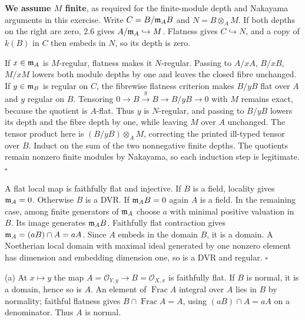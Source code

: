\documentclass[11pt]{article}
\let\chapterexercise\exercise
\renewcommand{\exercise}[2]{\Needspace{8\baselineskip}\chapterexercise{#1}{#2}}
\begin{document}
\pf
\textbf{We assume $M$ finite}, as required for the finite-module depth and Nakayama arguments in this exercise. Write $C=B/\mathfrak m_AB$ and $N=B\otimes_AM$. If both depths on the right are zero, 2.6 gives $A/\mathfrak m_A\hookrightarrow M$. Flatness gives $C\hookrightarrow N$, and a copy of $k(B)$ in $C$ then embeds in $N$, so its depth is zero.

If $x\in\mathfrak m_A$ is $M$-regular, flatness makes it $N$-regular. Passing to $A/xA$, $B/xB$, $M/xM$ lowers both module depths by one and leaves the closed fibre unchanged. If $y\in\mathfrak m_B$ is regular on $C$, the fibrewise flatness criterion makes $B/yB$ flat over $A$ and $y$ regular on $B$. Tensoring $0\to B\xrightarrow{y}B\to B/yB\to0$ with $M$ remains exact, because the quotient is $A$-flat. Thus $y$ is $N$-regular, and passing to $B/yB$ lowers its depth and the fibre depth by one, while leaving $M$ over $A$ unchanged. The tensor product here is $(B/yB)\otimes_A M$, correcting the printed ill-typed tensor over $B$. Induct on the sum of the two nonnegative finite depths. The quotients remain nonzero finite modules by Nakayama, so each induction step is legitimate. \hfill$\square$

\pf
A flat local map is faithfully flat and injective. If $B$ is a field, locality gives $\mathfrak m_A=0$. Otherwise $B$ is a DVR. If $\mathfrak m_AB=0$ again $A$ is a field. In the remaining case, among finite generators of $\mathfrak m_A$ choose $a$ with minimal positive valuation in $B$. Its image generates $\mathfrak m_AB$. Faithfully flat contraction gives $\mathfrak m_A=(aB)\cap A=aA$. Since $A$ embeds in the domain $B$, it is a domain. A Noetherian local domain with maximal ideal generated by one nonzero element has dimension and embedding dimension one, so is a DVR and regular. \hfill$\square$

\pf
(a) At $x\mapsto y$ the map $A=\mathcal O_{Y,y}\to B=\mathcal O_{X,x}$ is faithfully flat. If $B$ is normal, it is a domain, hence so is $A$. An element of $\operatorname{Frac}A$ integral over $A$ lies in $B$ by normality; faithful flatness gives $B\cap\operatorname{Frac}A=A$, using $(aB)\cap A=aA$ on a denominator. Thus $A$ is normal.
\end{document}
